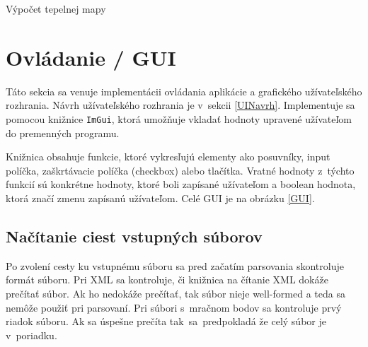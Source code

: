 \begin{algorithm}[b!]
\caption{Výpočet tepelnej mapy}\label{VypocetHMpseu}
\end{algorithm}

\section{Ovládanie / GUI}
Táto sekcia sa venuje implementácii ovládania aplikácie a grafického užívateľského rozhrania. Návrh užívateľského rozhrania je v~sekcii \ref{UINavrh}. Implementuje sa pomocou knižnice \verb|ImGui|, ktorá umožňuje vkladať hodnoty upravené užívateľom do premenných programu. 

Knižnica obsahuje funkcie, ktoré vykresľujú elementy ako posuvníky, input políčka, zaškrtávacie políčka (checkbox) alebo tlačítka. Vratné hodnoty z~týchto funkcií sú konkrétne hodnoty, ktoré boli zapísané užívateľom a boolean hodnota, ktorá značí zmenu zapísanú užívateľom. Celé GUI je na obrázku \ref{GUI}.

\subsection*{Načítanie ciest vstupných súborov}
Po zvolení cesty ku vstupnému súboru sa pred začatím parsovania skontroluje formát súboru. Pri XML sa kontroluje, či knižnica na čítanie XML dokáže prečítať súbor. Ak ho nedokáže prečítať, tak súbor nieje well-formed a teda sa nemôže použiť pri parsovaní. Pri súbori s~mračnom bodov sa kontroluje prvý riadok súboru. Ak sa úspešne prečíta tak~sa~predpokladá že celý súbor je v~poriadku.

